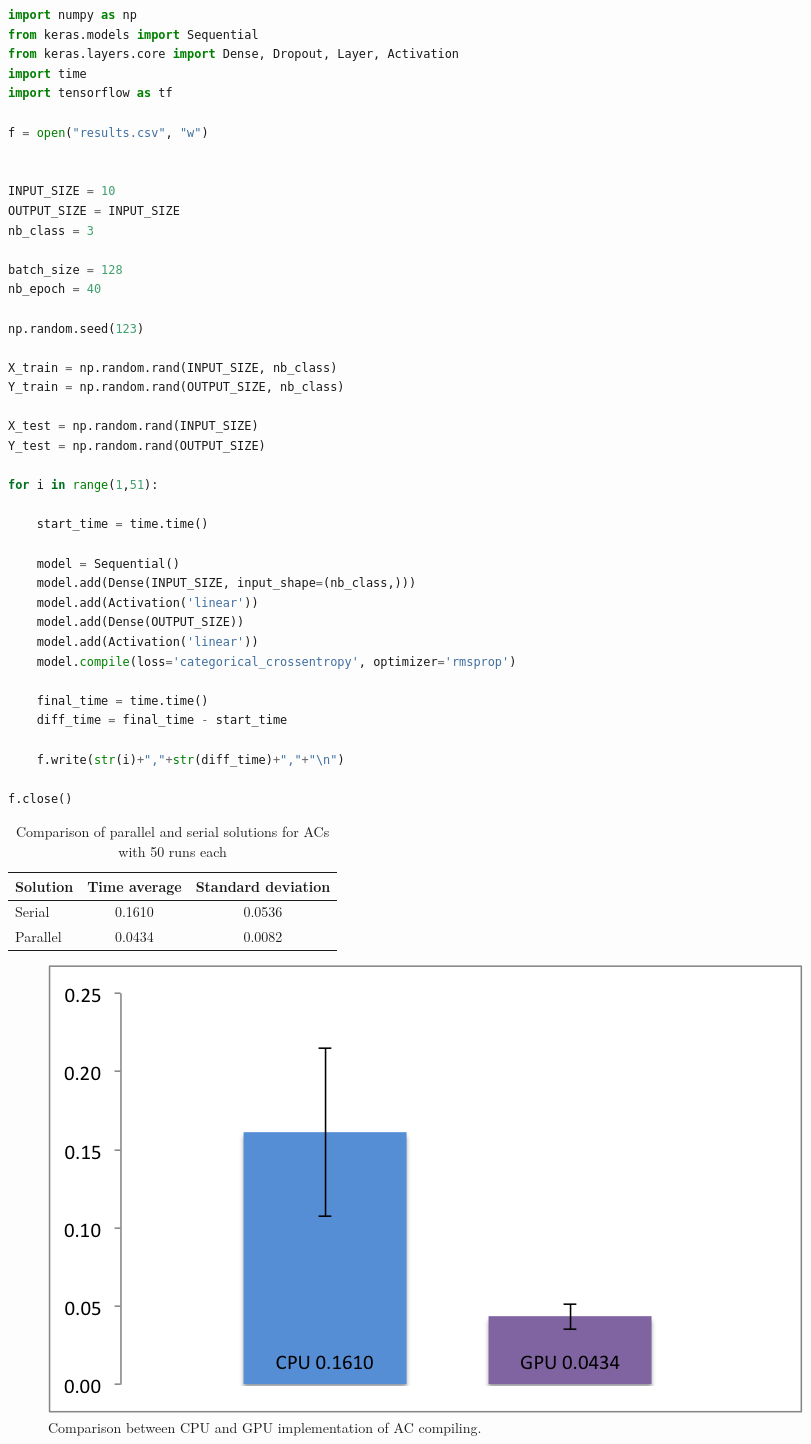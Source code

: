 \documentclass[twoside,11pt]{article}
\begin{document}
\begin{lstlisting}[language=python]
import numpy as np
from keras.models import Sequential
from keras.layers.core import Dense, Dropout, Layer, Activation
import time
import tensorflow as tf

f = open("results.csv", "w")


INPUT_SIZE = 10
OUTPUT_SIZE = INPUT_SIZE
nb_class = 3

batch_size = 128
nb_epoch = 40

np.random.seed(123)

X_train = np.random.rand(INPUT_SIZE, nb_class)
Y_train = np.random.rand(OUTPUT_SIZE, nb_class)

X_test = np.random.rand(INPUT_SIZE)
Y_test = np.random.rand(OUTPUT_SIZE)

for i in range(1,51):

    start_time = time.time()

    model = Sequential()
    model.add(Dense(INPUT_SIZE, input_shape=(nb_class,)))
    model.add(Activation('linear'))
    model.add(Dense(OUTPUT_SIZE))
    model.add(Activation('linear'))
    model.compile(loss='categorical_crossentropy', optimizer='rmsprop')

    final_time = time.time()
    diff_time = final_time - start_time

    f.write(str(i)+","+str(diff_time)+","+"\n")

f.close() 
\end{lstlisting}
 

\begin{table}[!h]
	\begin{center}
	\caption{Comparison of parallel and serial solutions for ACs with 50 runs each}
	  \begin{tabular}{ l | cc }
Solution & Time average & Standard deviation \\ \hline
Serial		& 	0.1610		&	0.0536	\\
Parallel 	& 	0.0434		&	0.0082
		\label{tab:bench_bns}
	\end{tabular}
  	\end{center}
\end{table}

\begin{figure}[H]
    \begin{center}
    	\includegraphics[width=0.7\columnwidth]{figures/graph.png}
		\caption{Comparison between CPU and GPU implementation of AC compiling.}
		\label{fig:deri}
    \end{center}
\end{figure}
\end{document}
